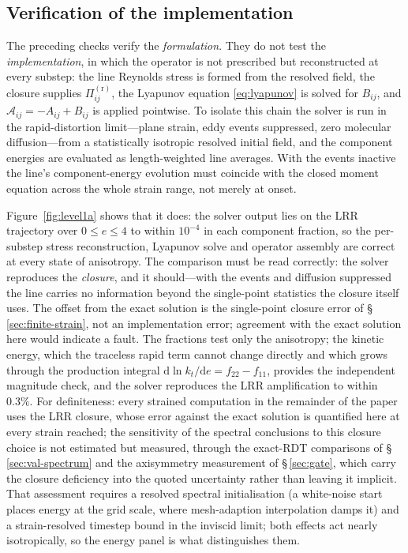 \documentclass[lineno]{JFM-FLM_Au}
\begin{document}
\subsection{Verification of the implementation}\label{sec:level1a}

The preceding checks verify the \emph{formulation}. They do not test the
\emph{implementation}, in which the operator is not prescribed but
reconstructed at every substep: the line Reynolds stress is formed from
the resolved field, the closure supplies $\Pi^{(\mathrm r)}_{ij}$, the
Lyapunov equation \eqref{eq:lyapunov} is solved for $B_{ij}$, and
$\mathcal{A}_{ij}=-A_{ij}+B_{ij}$ is applied pointwise. To isolate this
chain the solver is run in the rapid-distortion limit---plane strain,
eddy events suppressed, zero molecular diffusion---from a statistically
isotropic resolved initial field, and the component energies are
evaluated as length-weighted line averages. With the events inactive the
line's component-energy evolution must coincide with the closed moment
equation across the whole strain range, not merely at onset.

Figure~\ref{fig:level1a} shows that it does: the solver output lies on
the LRR trajectory over $0\le e\le4$ to within $10^{-4}$ in each
component fraction, so the per-substep stress reconstruction, Lyapunov
solve and operator assembly are correct at every state of anisotropy.
The comparison must be read correctly: the solver reproduces the
\emph{closure}, and it should---with the events and diffusion suppressed the line
carries no information beyond the single-point statistics the closure
itself uses. The offset from the exact solution is the single-point
closure error of \S\,\ref{sec:finite-strain}, not an implementation
error; agreement with the exact solution here would indicate a fault.
The fractions test only the anisotropy; the kinetic energy, which the
traceless rapid term cannot change directly and which grows through the
production integral
$\mathrm{d}\ln k_t/\mathrm{d}e=f_{22}-f_{11}$, provides the independent
magnitude check, and the solver reproduces the LRR amplification to
within $0.3\%$. For definiteness: every strained computation in the
remainder of the paper uses the LRR closure, whose error against the
exact solution is quantified here at every strain reached; the
sensitivity of the spectral conclusions to this closure choice is not
estimated but measured, through the exact-RDT comparisons of
\S\,\ref{sec:val-spectrum} and the axisymmetry measurement of
\S\,\ref{sec:gate}, which carry the closure deficiency into the quoted
uncertainty rather than leaving it implicit. That assessment requires a resolved spectral
initialisation (a white-noise start places energy at the grid scale,
where mesh-adaption interpolation damps it) and a strain-resolved
timestep bound in the inviscid limit; both effects act nearly
isotropically, so the energy panel is what distinguishes them.
\end{document}
